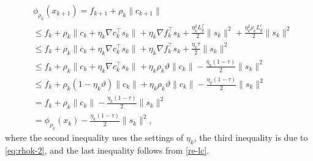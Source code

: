 \documentclass[11pt]{article}
\newcommand{\be}{\begin{equation}}
\newcommand{\ee}{\end{equation}}
\begin{document}
    \be\begin{aligned}\label{descent-ine}
        &\phi_{\rho_k}(x_{k+1})=f_{k+1} + \rho_k \|c_{k+1}\|\\
        &\leq f_k + \rho_k \|c_k + \eta_k \nabla c_k^\top s_k\| + \eta_k \nabla f_k^\top s_k + \frac{\eta_k^2 L_g^f}{2}\|s_k\|^2 + \frac{\eta_k^2\rho_kL_g^c}{2}\|s_k\|^2\\
        &\leq f_k + \rho_k \|c_k + \eta_k \nabla c_k^\top s_k\| +  \eta_k \nabla f_k^\top s_k + \frac{\eta_k \tau}{2}\|s_k\|^2\\ 
        &\leq f_k + \rho_k \|c_k + \eta_k \nabla c_k^\top s_k\| + \eta_k \rho_k \vartheta \|c_k\| - \frac{\eta_k\left(1-\tau\right)}{2}\|s_k\|^2\\
        &\leq f_k + \rho_k (1-\eta_k \vartheta)\|c_k\| + \eta_k \rho_k \vartheta \|c_k\| - \frac{\eta_k\left(1-\tau\right)}{2}\|s_k\|^2\\
        &= f_k + \rho_k \|c_k\|- \frac{\eta_k\left(1-\tau\right)}{2}\|s_k\|^2\\
        &= \phi_{\rho_k}(x_k) - \frac{\eta_k\left(1-\tau\right)}{2}\|s_k\|^2,
    \end{aligned}\ee
    where the second inequality uses the settings of \(\eta_k\), the third inequality is due to \eqref{eq:rhok-2}, and the last inequality follows from \eqref{re-lc}.
\end{document}
